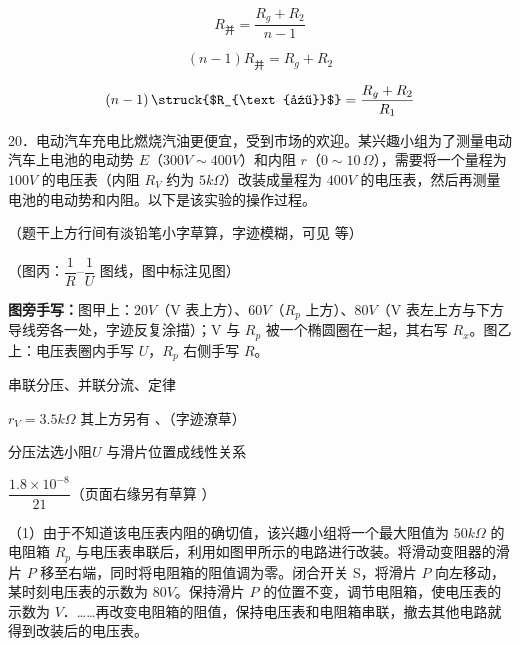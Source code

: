 \[
R_{\text{并}}=\frac{R_g+R_2}{n-1}
\]

\[
(n-1)R_{\text{并}}=R_g+R_2
\]

\[
(n-1)\,\text{\struck{$R_{\text{并}}$}}=\frac{R_g+R_2}{R_1} %
\]
\begin{problem}[粘贴印刷题 20]
20．电动汽车充电比燃烧汽油更便宜，受到市场的欢迎。某兴趣小组为了测量电动汽车上电池的电动势 $E$（$300\unit{V}\sim400\unit{V}$）和内阻 $r$（$0\sim10\,\Omega$），需要将一个量程为 $100\unit{V}$ 的电压表（内阻 $R_V$ 约为 $5\unit{k\Omega}$）改装成量程为 $400\unit{V}$ 的电压表，然后再测量电池的电动势和内阻。以下是该实验的操作过程。

\noindent（题干上方行间有淡铅笔小字草算，字迹模糊，可见  等）




（图丙：$\dfrac1R$--$\dfrac1U$ 图线，图中标注见图）

\noindent\textbf{图旁手写：}图甲上：$20\unit{V}$（V 表上方）、$60\unit{V}$（$R_p$ 上方）、$80\unit{V}$（V 表左上方与下方导线旁各一处，字迹反复涂描）；V 与 $R_p$ 被一个椭圆圈在一起，其右写 $R_x$。图乙上：电压表圈内手写 $U$，$R_p$ 右侧手写 $R$。

串联分压、并联分流、定律%

$r_V=3.5\unit{k\Omega}$%
\quad 其上方另有 、（字迹潦草）

分压法选小阻\quad $U$ 与滑片位置成线性关系

$\dfrac{1.8\times10^{-8}}{21}$\quad {}\quad（页面右缘另有草算 ）

（1）由于不知道该电压表内阻的确切值，该兴趣小组将一个最大阻值为 $50\unit{k\Omega}$ 的电阻箱 $R_p$ 与电压表串联后，利用如图甲所示的电路进行改装。将滑动变阻器的滑片 $P$ 移至右端，同时将电阻箱的阻值调为零。闭合开关 S，将滑片 $P$ 向左移动，某时刻电压表的示数为 $80\unit{V}$。保持滑片 $P$ 的位置不变，调节电阻箱，使电压表的示数为 \underline{\hspace{2.5em}} $\unit{V}$．……再改变电阻箱的阻值，保持电压表和电阻箱串联，撤去其他电路就得到改装后的电压表。%


\end{problem}

